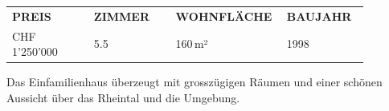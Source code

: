 \documentclass[11pt,a4paper]{article}
\begin{document}
\noindent\colorbox{bhvnavy}{\begin{minipage}{0.97\linewidth}\color{white}
\begin{tabular}{p{0.22\linewidth}p{0.22\linewidth}p{0.22\linewidth}p{0.22\linewidth}}
\textbf{PREIS} & \textbf{ZIMMER} & \textbf{WOHNFLÄCHE} & \textbf{BAUJAHR}\\
CHF 1'250'000 & 5.5 & 160\,m² & 1998\\
\end{tabular}
\end{minipage}}

Das Einfamilienhaus überzeugt mit grosszügigen Räumen und einer schönen Aussicht über das Rheintal und die Umgebung.
\end{document}
